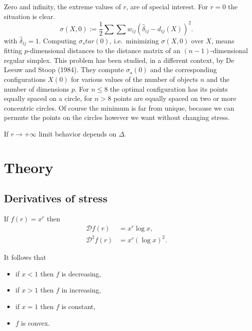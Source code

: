 \documentclass[
  12pt,
]{article}
\providecommand{\tightlist}{%
  \setlength{\itemsep}{0pt}\setlength{\parskip}{0pt}}
\begin{document}
Zero and infinity, the extreme values of \(r\), are of special interest.
For \(r=0\) the situation is clear.
\begin{equation}
\sigma(X, 0):=\frac12\sum\sum w_{ij}(\hat\delta_{ij}-d_{ij}(X))^2.
\label{eq:rstressnull}
\end{equation}
with \(\hat\delta_{ij}=1\). Computing \(\sigma_star(0)\), i.e.~minimizing \(\sigma(X, 0)\) over \(X\), means
fitting \(p\)-dimensional distances to the distance matrix of an
\((n-1)\)-dimensional regular simplex. This problem has been
studied, in a different context, by De Leeuw and Stoop (1984).
They compute \(\sigma_\star(0)\) and the corresponding configurations
\(X(0)\) for various values of the number of objects \(n\)
and the number of dimensions \(p\). For \(n\leq 8\) the optimal
configuration has its points equally spaced on a circle, for
\(n>8\) points are equally spaced on two or more concentric
circles. Of course the minimum is far from unique, because
we can permute the points on the circles however we want
without changing stress.

If \(r\rightarrow+\infty\) limit behavior depends on \(\Delta\).

\section{Theory}\label{theory}

\subsection{Derivatives of stress}\label{derivatives-of-stress}

If \(f(r)=x^r\) then
\begin{subequations}
\begin{align}
\mathcal{D}f(r)&=x^r\log x,\label{eq:der1}\\
\mathcal{D}^2f(r)&=x^r(\log x)^2\label{eq:der2}.
\end{align}
\end{subequations}

It follows that

\begin{itemize}
\tightlist
\item
  if \(x < 1\) then \(f\) is decreasing,
\item
  if \(x > 1\) then \(f\) in increasing,
\item
  if \(x = 1\) then \(f\) is constant,
\item
  \(f\) is convex.
\end{itemize}
\end{document}
